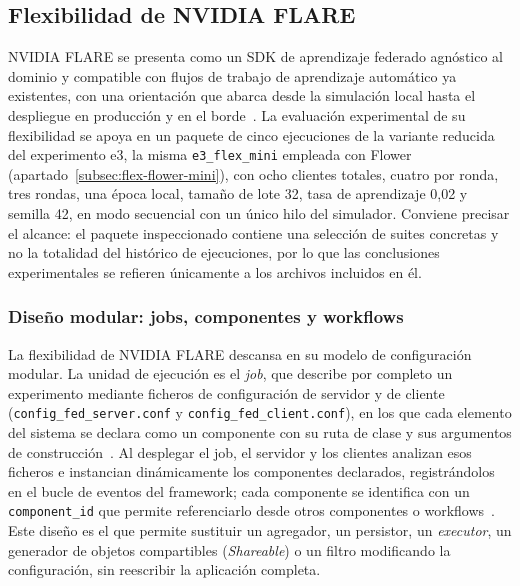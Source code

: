 \subsection{Flexibilidad de NVIDIA FLARE}\label{sec:flex-nvflare}

NVIDIA FLARE se presenta como un SDK de aprendizaje federado agnóstico al dominio
y compatible con flujos de trabajo de aprendizaje automático ya existentes, con
una orientación que abarca desde la simulación local hasta el despliegue en
producción y en el borde~\parencite{roth2022nvflare,nvflareWelcome}. La evaluación
experimental de su flexibilidad se apoya en un paquete de cinco ejecuciones de la
variante reducida del experimento e3, la misma \texttt{e3\_\allowbreak flex\_\allowbreak mini} empleada con
Flower (apartado~\ref{subsec:flex-flower-mini}), con ocho clientes totales,
cuatro por ronda, tres rondas, una época local, tamaño de lote 32, tasa de
aprendizaje 0,02 y semilla 42, en modo secuencial con un único hilo del simulador.
Conviene precisar el alcance: el paquete inspeccionado contiene una selección de
suites concretas y no la totalidad del histórico de ejecuciones, por lo que las
conclusiones experimentales se refieren únicamente a los archivos incluidos en él.

\subsubsection{Diseño modular: jobs, componentes y workflows}\label{subsec:flex-nvflare-modular}

La flexibilidad de NVIDIA FLARE descansa en su modelo de configuración modular. La
unidad de ejecución es el \textit{job}, que describe por completo un experimento
mediante ficheros de configuración de servidor y de cliente
(\texttt{config\_\allowbreak fed\_\allowbreak server.conf} y \texttt{config\_\allowbreak fed\_\allowbreak client.conf}), en los que
cada elemento del sistema se declara como un componente con su ruta de clase y sus
argumentos de construcción~\parencite{nvflareComponents}. Al desplegar el job, el
servidor y los clientes analizan esos ficheros e instancian dinámicamente los
componentes declarados, registrándolos en el bucle de eventos del framework; cada
componente se identifica con un \texttt{component\_\allowbreak id} que permite referenciarlo
desde otros componentes o workflows~\parencite{nvflareComponents}. Este diseño es
el que permite sustituir un agregador, un persistor, un \textit{executor}, un
generador de objetos compartibles (\textit{Shareable}) o un filtro modificando la
configuración, sin reescribir la aplicación completa.

